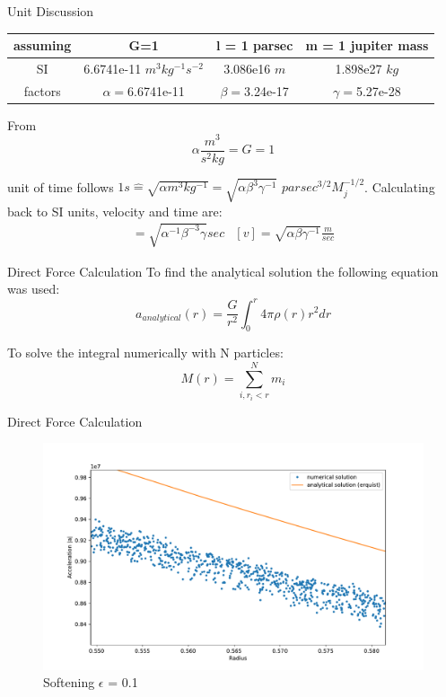 \documentclass{beamer}
\begin{document}
\begin{frame}{Unit Discussion}
	\begin{table}[H]
		\begin{tabular}{|c|c|c|c|}
			\hline 
			assuming & G=1 & l = 1 parsec & m = 1 jupiter mass \\ 
			\hline 
			SI & 6.6741e-11 $m^3 kg^{-1} s^{-2}$ &  3.086e16 $m$& 1.898e27 $kg$ \\ 
			\hline 
			factors& $\alpha = $6.6741e-11 & $\beta=$3.24e-17 & $\gamma=$5.27e-28 \\
			\hline
		\end{tabular} 
	\end{table}

	From
	\begin{equation}
		\alpha \frac{m^3}{s^2 kg} = G = 1
	\end{equation}

	unit of time follows
	$1s \hat{=} \sqrt{\alpha m^3 kg^{-1}} = \sqrt{\alpha \beta ^3 \gamma ^{-1}} $ $parsec ^{3/2} M_j ^{-1/2} $.
	Calculating back to SI units, velocity and time are:
	\begin{eqnarray}
		[t] = \sqrt{\alpha ^{-1} \beta ^{-3} \gamma} sec &
		[v] = \sqrt{\alpha \beta \gamma ^{-1}} \frac{m}{sec}
	\end{eqnarray}	
	
\end{frame}

\begin{frame}{Direct Force Calculation}
To find the analytical solution the following equation was used:
\begin{equation}
	a_{analytical}(r) = \frac{G}{r^2} \int_{0}^{r} 4 \pi \rho (r) r^2  dr  
\end{equation}

To solve the integral numerically with N particles:
\begin{equation}
	M(r) = \sum_{i, r_i < r}^N m_i   
\end{equation}

\end{frame}

\begin{frame}{Direct Force Calculation}
\begin{figure}
	\centering
	\includegraphics[width=1.0\linewidth]{hernquist3}
	\caption{Softening $\epsilon$ = 0.1}
	\label{fig:hernquist3}
\end{figure}
\end{frame}
\end{document}
